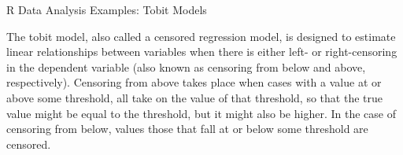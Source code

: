 R Data Analysis Examples: Tobit Models

The tobit model, also called a censored regression model, is designed to estimate linear relationships between variables when there is either left- or right-censoring in the dependent variable (also known as censoring from below and above, respectively). Censoring from above takes place when cases with a value at or above some threshold, all take on the value of that threshold, so that the true value might be equal to the threshold, but it might also be higher. In the case of censoring from below, values those that fall at or below some threshold are censored.

